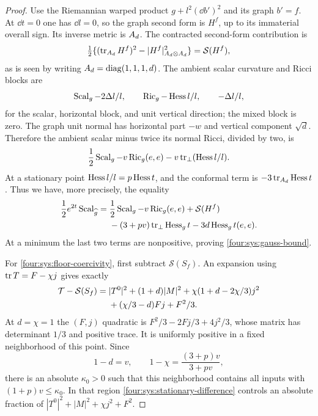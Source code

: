 \begin{proof}
Use the Riemannian warped product $g+l^2(\dd b')^2$ and its graph
$b'=f$.  At $\dd t=0$ one has $\dd l=0$, so the graph second form is
$H^f$, up to its immaterial overall sign.  Its inverse metric is $A_d$.
The contracted second-form contribution is
\[
 \tfrac12\{(\operatorname{tr}_{A_d}H^f)^2-|H^f|_{A_d\otimes A_d}^2\}
   =\mathcal S(H^f),
\]
as is seen by writing $A_d=\operatorname{diag}(1,1,1,d)$.
The ambient scalar curvature and Ricci blocks are
\[
 \operatorname{Scal}_g-2\Delta l/l,\qquad
 \operatorname{Ric}_g-\operatorname{Hess} l/l,\qquad -\Delta l/l,
\]
for the scalar, horizontal block, and unit vertical direction;
the mixed block is zero.  The graph unit normal has horizontal part
$-w$ and vertical component $\sqrt d$.  Therefore the ambient scalar
minus twice its normal Ricci, divided by two, is
\[
 \frac12\operatorname{Scal}_g-v\operatorname{Ric}_g(e,e)
                     -v\operatorname{tr}_\perp(\operatorname{Hess} l/l).
\]
At a stationary point $\operatorname{Hess} l/l=p\operatorname{Hess} t$, and the conformal term
is $-3\operatorname{tr}_{A_d}\operatorname{Hess} t$.  Thus we have, more precisely, the equality
\begin{equation}\label{four:sys:stationary-gauss-exact}
\begin{aligned}
 \frac12e^{2t}\operatorname{Scal}_{\widehat g}
 ={}&\frac12\operatorname{Scal}_g-v\operatorname{Ric}_g(e,e)+\mathcal S(H^f)\\
 &-(3+pv)\operatorname{tr}_\perp\operatorname{Hess}_g t-3d\operatorname{Hess}_g t(e,e).
\end{aligned}
\end{equation}
At a minimum the last two terms are nonpositive, proving
\eqref{four:sys:gauss-bound}.

For \eqref{four:sys:floor-coercivity}, first subtract $\mathcal S(S_f)$.
An expansion using $\operatorname{tr} T=F-\chi j$ gives exactly
\begin{equation}\label{four:sys:stationary-difference}
\begin{aligned}
 \mathcal T-\mathcal S(S_f)
 ={}&|T^0|^2+(1+d)|M|^2
       +\chi(1+d-2\chi/3)j^2\\
 &+(\chi/3-d)Fj+F^2/3.
\end{aligned}
\end{equation}
At $d=\chi=1$ the $(F,j)$ quadratic is
$F^2/3-2Fj/3+4j^2/3$, whose matrix has determinant $1/3$ and positive
trace.  It is uniformly positive in a fixed neighborhood of this point.
Since
\[
 1-d=v,\qquad 1-\chi=\frac{(3+p)v}{3+pv},
\]
there is an absolute $\kappa_0>0$ such that this neighborhood contains
all inputs with $(1+p)v\le\kappa_0$.  In that region
\eqref{four:sys:stationary-difference} controls an absolute fraction of
$|T^0|^2+|M|^2+\chi j^2+F^2$.


\end{proof}
